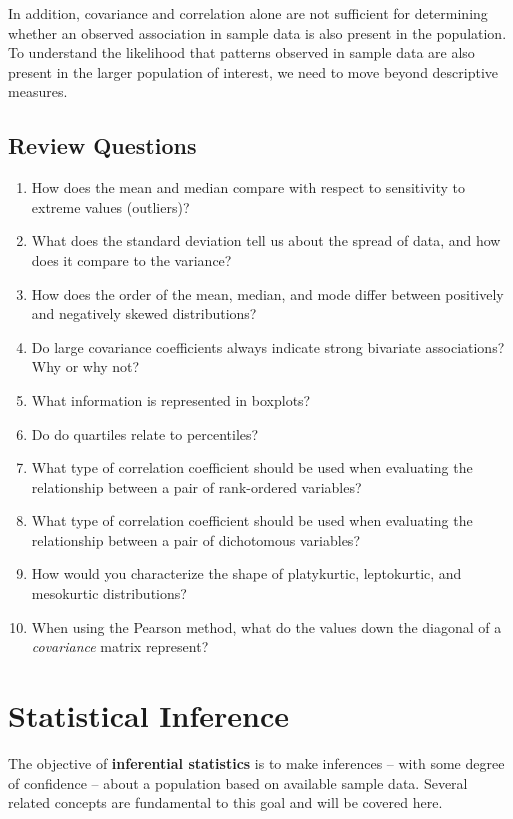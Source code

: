 \documentclass[
]{book}
\begin{document}
In addition, covariance and correlation alone are not sufficient for determining whether an observed association in sample data is also present in the population. To understand the likelihood that patterns observed in sample data are also present in the larger population of interest, we need to move beyond descriptive measures.

\hypertarget{review-questions-4}{%
\section{Review Questions}\label{review-questions-4}}

\begin{enumerate}
\def\labelenumi{\arabic{enumi}.}
\item
  How does the mean and median compare with respect to sensitivity to extreme values (outliers)?
\item
  What does the standard deviation tell us about the spread of data, and how does it compare to the variance?
\item
  How does the order of the mean, median, and mode differ between positively and negatively skewed distributions?
\item
  Do large covariance coefficients always indicate strong bivariate associations? Why or why not?
\item
  What information is represented in boxplots?
\item
  Do do quartiles relate to percentiles?
\item
  What type of correlation coefficient should be used when evaluating the relationship between a pair of rank-ordered variables?
\item
  What type of correlation coefficient should be used when evaluating the relationship between a pair of dichotomous variables?
\item
  How would you characterize the shape of platykurtic, leptokurtic, and mesokurtic distributions?
\item
  When using the Pearson method, what do the values down the diagonal of a \emph{covariance} matrix represent?
\end{enumerate}

\hypertarget{inf-stats}{%
\chapter{Statistical Inference}\label{inf-stats}}

The objective of \textbf{inferential statistics} is to make inferences -- with some degree of confidence -- about a population based on available sample data. Several related concepts are fundamental to this goal and will be covered here.
\end{document}
